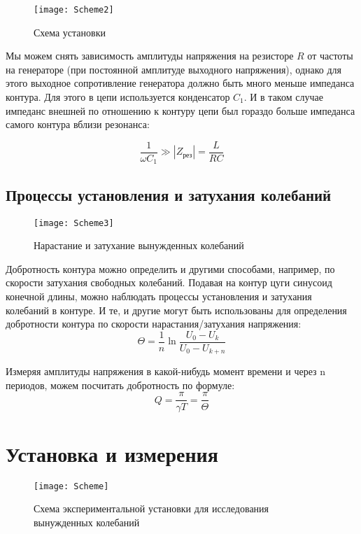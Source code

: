 \documentclass{lab}
\begin{document}
\begin{wrapfigure}[10]{l}{6cm}
	\texttt{[image: Scheme2]}
	\caption{\footnotesize Схема установки}
	\label{scheme1}
\end{wrapfigure}

Мы можем снять зависимость амплитуды напряжения на резисторе $R$ от частоты на генераторе (при постоянной амплитуде выходного напряжения), однако для этого выходное сопротивление генератора должно быть много меньше импеданса контура. Для этого в цепи используется конденсатор $C_1$. И в таком случае импеданс внешней по отношению к контуру цепи был гораздо больше импеданса самого контура вблизи резонанса:

$$\dfrac{1}{\omega C_1} \gg |Z_\text{рез}| = \dfrac{L}{RC} $$

\newpage

\subsection*{Процессы установления и затухания колебаний}

\begin{wrapfigure}[12]{l}{7cm}
	\texttt{[image: Scheme3]}
	\caption{\footnotesize Нарастание и затухание вынужденных колебаний}
\end{wrapfigure} 

Добротность контура можно определить и другими способами, например, по скорости затухания свободных колебаний. Подавая на контур цуги синусоид конечной длины, можно наблюдать процессы установления и затухания колебаний в контуре. И те, и другие могут быть использованы для определения добротности контура по скорости нарастания/затухания напряжения:\\

$$\Theta = \dfrac{1}{n} \ln \dfrac{U_0 - U_k}{U_0-U_{k+n}} $$

Измеряя амплитуды напряжения в какой-нибудь момент времени и через n периодов, можем посчитать добротность по формуле:
$$Q = \dfrac{\pi}{\gamma T} = \dfrac{\pi}{\Theta}$$

\section*{Установка и измерения}

\begin{figure}[!h]
	\texttt{[image: Scheme]}
	\caption{\footnotesize Схема экспериментальной установки для исследования вынужденных колебаний}
\end{figure}
\end{document}
